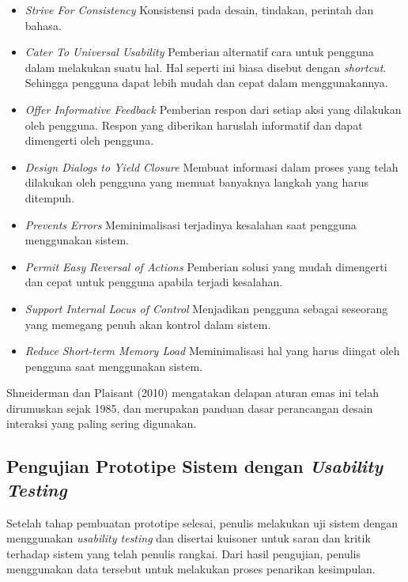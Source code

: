 	\begin{itemize}
		\item \textit{Strive For Consistency}
		\subitem Konsistensi pada desain, tindakan, perintah dan bahasa.
		\item \textit{Cater To Universal Usability}
		\subitem Pemberian alternatif cara untuk pengguna dalam melakukan suatu hal. Hal seperti ini biasa disebut dengan \textit{shortcut}. Sehingga pengguna dapat lebih mudah dan cepat dalam menggunakannya.
		\item \textit{Offer Informative Feedback}
		\subitem Pemberian respon dari setiap aksi yang dilakukan oleh pengguna. Respon yang diberikan haruslah informatif dan dapat dimengerti oleh pengguna.
		\item \textit{Design Dialogs to Yield Closure}
		\subitem Membuat informasi dalam proses yang telah dilakukan oleh pengguna yang memuat banyaknya langkah yang harus ditempuh.
		\item \textit{Prevents Errors}
		\subitem Meminimalisasi terjadinya kesalahan saat pengguna menggunakan sistem.
		\item \textit{Permit Easy Reversal of Actions}
		\subitem Pemberian solusi yang mudah dimengerti dan cepat untuk pengguna apabila terjadi kesalahan.
		\item \textit{Support Internal Locus of Control}
		\subitem Menjadikan pengguna sebagai seseorang yang memegang penuh akan kontrol dalam sistem.
		\item \textit{Reduce Short-term Memory Load}
		\subitem Meminimalisasi hal yang harus diingat oleh pengguna saat menggunakan sistem.
	\end{itemize}

	Shneiderman dan Plaisant (2010) mengatakan delapan aturan emas ini telah dirumuskan sejak 1985, dan merupakan panduan dasar perancangan desain interaksi yang paling sering digunakan.
	
	\subsection{Pengujian Prototipe Sistem dengan \textit{Usability Testing}}
	
	Setelah tahap pembuatan prototipe selesai, penulis melakukan uji sistem dengan menggunakan \textit{usability testing} dan disertai kuisoner untuk saran dan kritik terhadap sistem yang telah penulis rangkai. Dari hasil pengujian, penulis menggunakan data tersebut untuk melakukan proses penarikan kesimpulan.
	
